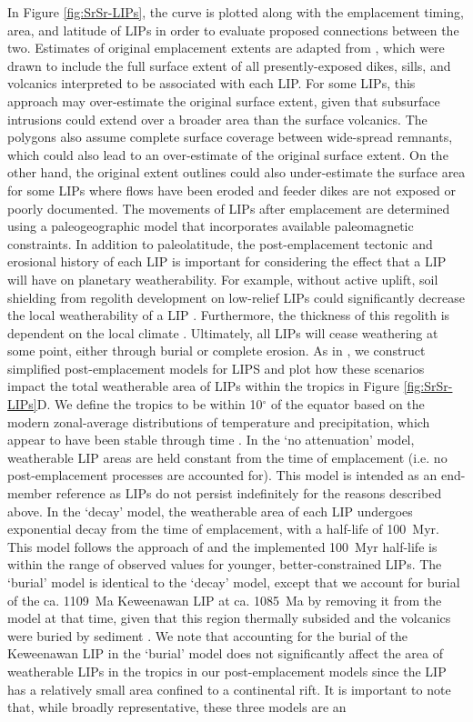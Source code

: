 In Figure \ref{fig:SrSr-LIPs}, the \SrSr curve is plotted along with the emplacement timing, area, and latitude of LIPs in order to evaluate proposed connections between the two. Estimates of original emplacement extents are adapted from \citet{Ernst2017a}, which were drawn to include the full surface extent of all presently-exposed dikes, sills, and volcanics interpreted to be associated with each LIP. For some LIPs, this approach may over-estimate the original surface extent, given that subsurface intrusions could extend over a broader area than the surface volcanics. The polygons also assume complete surface coverage between wide-spread remnants, which could also lead to an over-estimate of the original surface extent. On the other hand, the original extent outlines could also under-estimate the surface area for some LIPs where flows have been eroded and feeder dikes are not exposed or poorly documented. The movements of LIPs after emplacement are determined using a paleogeographic model that incorporates available paleomagnetic constraints. In addition to paleolatitude, the post-emplacement tectonic and erosional history of each LIP is important for considering the effect that a LIP will have on planetary weatherability. For example, without active uplift, soil shielding from regolith development on low-relief LIPs could significantly decrease the local weatherability of a LIP \citep{Gabet2009a, Hartmann2014a, Godderis2017b}. Furthermore, the thickness of this regolith is dependent on the local climate \citep{Norton2014a}. Ultimately, all LIPs will cease weathering at some point, either through burial or complete erosion. As in \citet{Park2019a}, we construct simplified post-emplacement models for LIPS and plot how these scenarios impact the total weatherable area of LIPs within the tropics in Figure \ref{fig:SrSr-LIPs}D. We define the tropics to be within 10$^{\circ}$ of the equator based on the modern zonal-average distributions of temperature and precipitation, which appear to have been stable through time \citep{Evans2006a}. In the `no attenuation' model, weatherable LIP areas are held constant from the time of emplacement (i.e. no post-emplacement processes are accounted for). This model is intended as an end-member reference as LIPs do not persist indefinitely for the reasons described above. In the `decay' model, the weatherable area of each LIP undergoes exponential decay from the time of emplacement, with a half-life of 100~Myr. This model follows the approach of \citet{Godderis2017a} and the implemented 100~Myr half-life is within the range of observed values for younger, better-constrained LIPs. The `burial' model is identical to the `decay' model, except that we account for burial of the ca. 1109~Ma Keweenawan LIP at ca. 1085~Ma by removing it from the model at that time, given that this region thermally subsided and the volcanics were buried by sediment \citep{White1997a, Ojakangas2001a, Swanson-Hysell2019a}. We note that accounting for the burial of the Keweenawan LIP in the `burial' model does not significantly affect the area of weatherable LIPs in the tropics in our post-emplacement models since the LIP has a relatively small area confined to a continental rift. It is important to note that, while broadly representative, these three models are an 